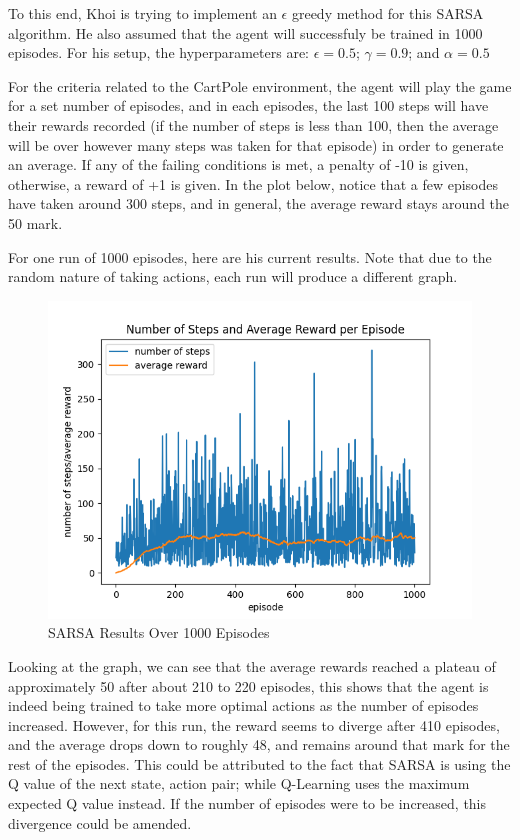 \documentclass[nohyperref]{article}
\theoremstyle{plain}
\theoremstyle{definition}
\theoremstyle{remark}
\begin{document}
To this end, Khoi is trying to implement an $\epsilon$ greedy method for this SARSA algorithm. He also assumed that the agent will successfuly be trained in 1000 episodes. For his setup, the hyperparameters are: $\epsilon = 0.5$; $\gamma = 0.9$; and $\alpha = 0.5$

For the criteria related to the CartPole environment, the agent will play the game for a set number of episodes, and in each episodes, the last 100 steps will have their rewards recorded (if the number of steps is less than 100, then the average will be over however many steps was taken for that episode) in order to generate an average.
If any of the failing conditions is met, a penalty of -10 is given, otherwise, a reward of +1 is given. In the plot below, notice that a few episodes have taken around 300 steps, and in general, the average reward stays around the 50 mark.

For one run of 1000 episodes, here are his current results. Note that due to the random nature of taking actions, each run will produce a different graph.

\begin{figure}[H] %
    \centering
    \includegraphics[width=1\linewidth]{sarsa-average-1k.png}
    \caption{SARSA Results Over 1000 Episodes}
\end{figure}

Looking at the graph, we can see that the average rewards reached a plateau of approximately 50 after about 210 to 220 episodes, this shows that the agent is indeed being trained to
take more optimal actions as the number of episodes increased. However, for this run, the reward seems to diverge after 410 episodes, and the average drops down to roughly 48, and remains around
that mark for the rest of the episodes. This could be attributed to the fact that SARSA is using the Q value of the next state, action pair; while Q-Learning uses the maximum expected Q value instead.
If the number of episodes were to be increased, this divergence could be amended.
\end{document}
